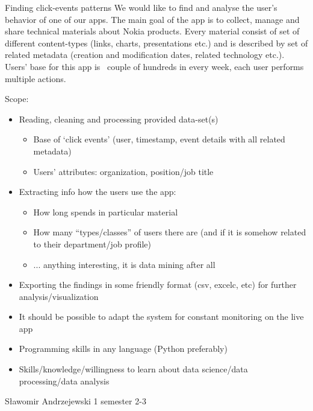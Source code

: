 \begin{project}
{Finding click-events patterns}
{We would like to find and analyse the user’s behavior of one of our apps. The main goal of the app is to collect, manage and share technical materials about Nokia products. Every material consist of set of different content-types (links, charts, presentations etc.) and is described by set of related metadata (creation and modification dates, related technology etc.). Users’ base for this app is ~couple of hundreds in every week, each user performs multiple actions.} 
{
Scope:
\begin{itemize}
	\item Reading, cleaning and processing provided data-set(s)
		\begin{itemize}
			\item Base of ‘click events’ (user, timestamp, event details with all related metadata)
			\item Users’ attributes: organization, position/job title
		\end{itemize}
	\item Extracting info how the users use the app:
		\begin{itemize}
			\item How long spends in particular material
			\item How many “types/classes” of users there are (and if it is somehow related to their department/job profile)
			\item ... anything interesting, it is data mining after all
		\end{itemize}
	\item Exporting the findings in some friendly format (csv, excelc, etc) for further analysis/visualization
	\item It should be possible to adapt the system for constant monitoring on the live app 
\end{itemize}
}
{
\begin{itemize}
	\item Programming skills in any language (Python preferably)
	\item Skills/knowledge/willingness to learn about data science/data processing/data analysis
\end{itemize}
}
{Sławomir Andrzejewski}
{1 semester}
{2-3}
\end{project}
